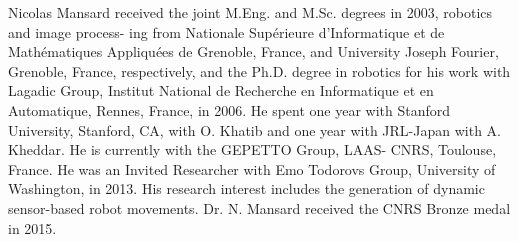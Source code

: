 \documentclass[journal]{IEEEtran}
\begin{document}
\begin{IEEEbiography}{Nicolas Mansard}
received the joint M.Eng. and
M.Sc. degrees in 2003, robotics and image process-
ing from Nationale Supérieure d'Informatique et de
Mathématiques Appliquées de Grenoble,
France, and University Joseph Fourier, Grenoble,
France, respectively, and the Ph.D. degree in robotics
for his work with Lagadic Group, Institut National
de Recherche en Informatique et en Automatique,
Rennes, France, in 2006. He spent one year with
Stanford University, Stanford, CA, with O. Khatib
and one year with JRL-Japan with A. Kheddar. He
is currently with the GEPETTO Group, LAAS- CNRS, Toulouse, France.
He was an Invited Researcher with Emo Todorovs Group, University of
Washington, in 2013. His research interest includes the generation of dynamic
sensor-based robot movements. Dr. N. Mansard received the CNRS Bronze
medal in 2015.
\end{IEEEbiography}








\end{document}
